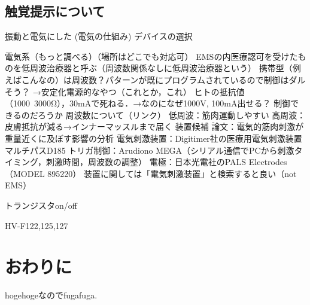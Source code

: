     \subsection{触覚提示について}
        振動と電気にした
        (電気の仕組み)
        デバイスの選択

            電気系（もっと調べる）（場所はどこでも対応可）
        EMSの内医療認可を受けたものを低周波治療器と呼ぶ（周波数関係なしに低周波治療器という）
        携帯型（例えばこんなの）は周波数？パターンが既にプログラムされているので制御はダルそう？
        →安定化電源的なやつ（これとか，これ）
        ヒトの抵抗値（1000~3000Ω），30mAで死ねる．→なのになぜ1000V, 100mA出せる？
        制御できるのだろうか
        周波数について（リンク）
        低周波：筋肉運動しやすい
        高周波：皮膚抵抗が減る→インナーマッスルまで届く
        装置候補
        論文：電気的筋肉刺激が重量近くに及ぼす影響の分析
        電気刺激装置：Digitimer社の医療用電気刺激装置マルチパスD185
        トリガ制御：Arudiono MEGA（シリアル通信でPCから刺激タイミング，刺激時間，周波数の調整）
        電極：日本光電社のPALS Electrodes（MODEL 895220）
        装置に関しては「電気刺激装置」と検索すると良い（not EMS）


        トランジスタon/off

        HV-F122,125,127
        
\section{おわりに}
    hogehogeなのでfugafuga.